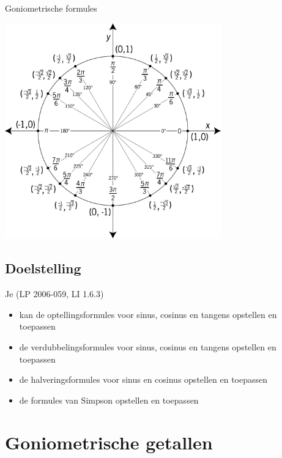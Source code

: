 \documentclass[a4paper,12pt]{article}
\begin{document}
\thispagestyle{empty}
\begin{center}
  \begin{mdframed}
  \centering
  \fontsize{40}{50}\selectfont Goniometrische formules
  \end{mdframed}
  \vfill
  \includegraphics[width=0.7\textwidth]{unit-circle}
  \vfill
\end{center}
\subsection*{Doelstelling}
Je \hfill  {\scriptsize(LP 2006-059, LI 1.6.3)}
\begin{itemize}
  \item kan de optellingsformules voor sinus, cosinus en tangens opstellen en toepassen
  \item de verdubbelingsformules voor sinus, cosinus en tangens opstellen en toepassen
  \item de halveringsformules voor sinus en cosinus opstellen en toepassen
  \item de formules van Simpson opstellen en toepassen
\end{itemize}


\pagestyle{empty}
\mbox{}
\newpage
\clearpage
\thispagestyle{empty}
\tableofcontents
\newpage
\clearpage
{} 

\pagestyle{fancy}
\lhead{}

\onehalfspacing

\section{Goniometrische getallen}
\end{document}
